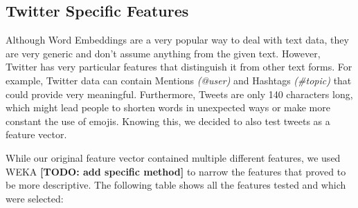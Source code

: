 \documentclass[11pt,onecolumn]{article} %
\begin{document}
\subsection{Twitter Specific Features}
Although Word Embeddings are a very popular way to deal with text data, they are very generic and don't assume anything from the given text. However, Twitter has very particular features that distinguish it from other text forms. For example, Twitter data can contain Mentions \textit{(@user)} and Hashtags \textit{(\#topic)} that could provide very meaningful. Furthermore, Tweets are only 140 characters long, which might lead people to shorten words in unexpected ways or make more constant the use of emojis. Knowing this, we decided to also test  tweets as a feature vector.

\par While our original feature vector contained multiple different features, we used WEKA \textbf{[TODO: add specific method]} to narrow the features that proved to be more descriptive. The following table shows all the features tested and which were selected:
\end{document}
